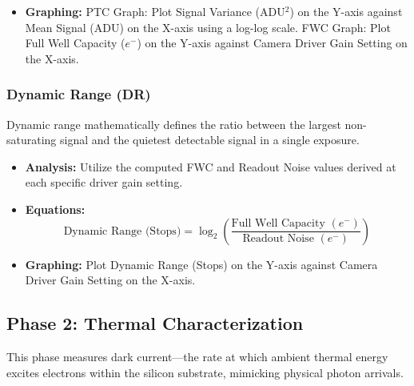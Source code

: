 \documentclass[11pt,a4paper]{article}
\begin{document}
\begin{itemize}[leftmargin=*]
\begin{enumerate}
            $$ \sigma^2_{diff} = \text{var}(I_{FlatA} - I_{FlatB}) \quad \rightarrow \quad \sigma^2_{signal} = \frac{\sigma^2_{diff}}{2} $$
            \item Isolate the linear region of the data (typically 10\% to 70\% of maximum saturation). Fit a first-order polynomial mapping Variance ($\sigma^2_{signal}$) as a function of Mean ($\bar{I}$). The system gain is the inverse of the linear slope: 
            $$ g = \frac{1}{\text{slope}} $$
            \item Locate the saturation index where variance peaks and abruptly drops. Multiply the Mean ADU value directly preceding this drop by the system gain to determine the Full Well Capacity: 
            $$ \text{FWC } (e^-) = \bar{I}_{saturation} \times g $$
        \end{enumerate}
    \item \textbf{Graphing:} PTC Graph: Plot Signal Variance (ADU$^2$) on the Y-axis against Mean Signal (ADU) on the X-axis using a log-log scale. FWC Graph: Plot Full Well Capacity ($e^-$) on the Y-axis against Camera Driver Gain Setting on the X-axis.
\end{itemize}

\subsubsection{Dynamic Range (DR)}
Dynamic range mathematically defines the ratio between the largest non-saturating signal and the quietest detectable signal in a single exposure.
\begin{itemize}[leftmargin=*]
    \item \textbf{Analysis:} Utilize the computed FWC and Readout Noise values derived at each specific driver gain setting.
    \item \textbf{Equations:} 
    $$ \text{Dynamic Range (Stops)} = \log_2 \left(\frac{\text{Full Well Capacity } (e^-)}{\text{Readout Noise } (e^-)}\right) $$
    \item \textbf{Graphing:} Plot Dynamic Range (Stops) on the Y-axis against Camera Driver Gain Setting on the X-axis.
\end{itemize}

\subsection{Phase 2: Thermal Characterization}
This phase measures dark current—the rate at which ambient thermal energy excites electrons within the silicon substrate, mimicking physical photon arrivals.
\end{document}
